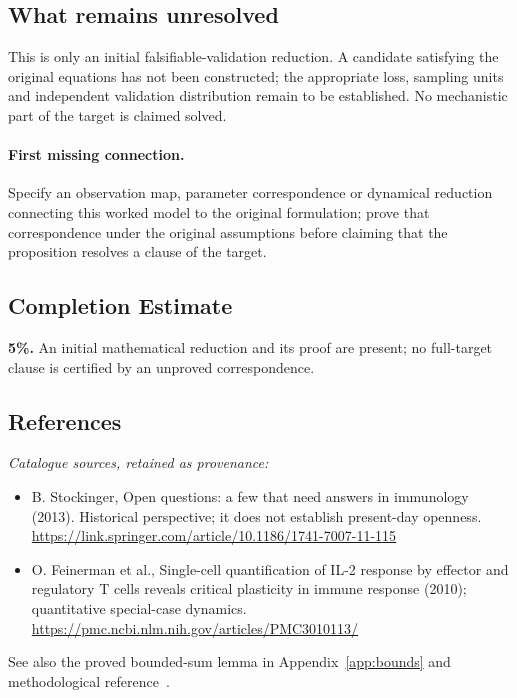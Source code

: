 \documentclass[11pt]{article}
\begin{document}
\subsection{What remains unresolved}
This is only an initial falsifiable-validation reduction. A candidate satisfying the original equations has not been constructed; the appropriate loss, sampling units and independent validation distribution remain to be established. No mechanistic part of the target is claimed solved.
\paragraph{First missing connection.} Specify an observation map, parameter correspondence or dynamical reduction connecting this worked model to the original formulation; prove that correspondence under the original assumptions before claiming that the proposition resolves a clause of the target.
\subsection{Completion Estimate}
\textbf{5\%.} An initial mathematical reduction and its proof are present; no full-target clause is certified by an unproved correspondence.
\subsection{References}
\noindent\emph{Catalogue sources, retained as provenance:}
\begin{itemize}
\item B. Stockinger, Open questions: a few that need answers in immunology (2013). Historical perspective; it does not establish present-day openness. \url{https://link.springer.com/article/10.1186/1741-7007-11-115}
\item O. Feinerman et al., Single-cell quantification of IL-2 response by effector and regulatory T cells reveals critical plasticity in immune response (2010); quantitative special-case dynamics. \url{https://pmc.ncbi.nlm.nih.gov/articles/PMC3010113/}
\end{itemize}
\noindent See also the proved bounded-sum lemma in Appendix~\ref{app:bounds} and methodological reference~\cite{hoeffding}.
\clearpage


\appendix
\end{document}
